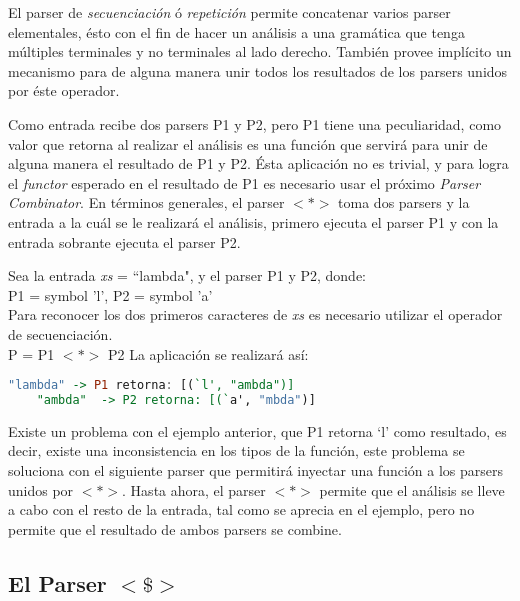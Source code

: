 El parser de \emph{secuenciación} ó \emph{repetición} permite concatenar varios parser elementales, ésto con el fin de hacer un análisis a una gramática que tenga múltiples terminales y no terminales al lado derecho. También provee implícito un mecanismo para de alguna manera unir todos los resultados de los parsers unidos por éste operador.

Como entrada recibe dos parsers \textsc{P1} y \textsc{P2}, pero \textsc{P1} tiene una peculiaridad, como valor que retorna al realizar el análisis es una función que servirá para unir de alguna manera el resultado de \textsc{P1} y \textsc{P2}. Ésta aplicación no es trivial, y para logra el \emph{functor} esperado en el resultado de \textsc{P1} es necesario usar el próximo \emph{Parser Combinator}.
En términos generales, el parser $<*>$ toma dos parsers y la entrada a la cuál se le realizará el análisis, primero ejecuta el parser \textsc{P1} y con la entrada sobrante ejecuta el parser \textsc{P2}.

\begin{exmp}
	Sea la entrada \emph{xs} = ``lambda", y el parser \textsc{P1} y \textsc{P2}, donde:\\	\textsc{P1} = symbol 'l',
	\textsc{P2} = symbol 'a'\\
	Para reconocer los dos primeros caracteres de \emph{xs} es necesario utilizar el operador de secuenciación.\\
	\textsc{P} = \textsc{P1} $<*>$ \textsc{P2}
	La aplicación se realizará así:
	
	\begin{lstlisting}[language=Haskell]
	"lambda" -> P1 retorna: [(`l', "ambda")]
	"ambda"  -> P2 retorna: [(`a', "mbda")]
	\end{lstlisting}
\end{exmp}

Existe un problema con el ejemplo anterior, que \textsc{P1} retorna `l' como resultado, es decir, existe una inconsistencia en los tipos de la función, este problema se soluciona con el siguiente parser que permitirá inyectar una función a los parsers unidos por $<*>$. Hasta ahora, el parser $<*>$ permite que el análisis se lleve a cabo con el resto de la entrada, tal como se aprecia en el ejemplo, pero no permite que el resultado de ambos parsers se combine.


\subsection{El Parser $<\$>$}

